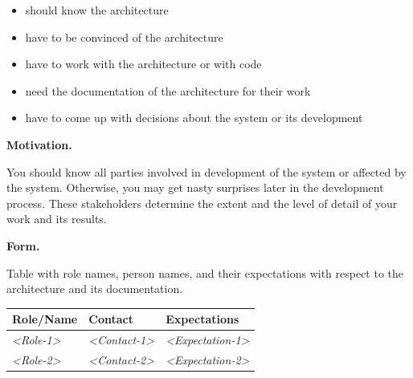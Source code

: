 \documentclass[]{article}
\begin{document}
\begin{itemize}
\item
  should know the architecture
\item
  have to be convinced of the architecture
\item
  have to work with the architecture or with code
\item
  need the documentation of the architecture for their work
\item
  have to come up with decisions about the system or its development
\end{itemize}

\textbf{Motivation.}

You should know all parties involved in development of the system or
affected by the system. Otherwise, you may get nasty surprises later in
the development process. These stakeholders determine the extent and the
level of detail of your work and its results.

\textbf{Form.}

Table with role names, person names, and their expectations with respect
to the architecture and its documentation.

\begin{longtable}[]{@{}lll@{}}
\toprule
\begin{minipage}[b]{0.18\columnwidth}\raggedright
Role/Name\strut
\end{minipage} & \begin{minipage}[b]{0.37\columnwidth}\raggedright
Contact\strut
\end{minipage} & \begin{minipage}[b]{0.37\columnwidth}\raggedright
Expectations\strut
\end{minipage}\tabularnewline
\midrule
\endhead
\begin{minipage}[t]{0.18\columnwidth}\raggedright
\emph{\textless{}Role-1\textgreater{}}\strut
\end{minipage} & \begin{minipage}[t]{0.37\columnwidth}\raggedright
\emph{\textless{}Contact-1\textgreater{}}\strut
\end{minipage} & \begin{minipage}[t]{0.37\columnwidth}\raggedright
\emph{\textless{}Expectation-1\textgreater{}}\strut
\end{minipage}\tabularnewline
\begin{minipage}[t]{0.18\columnwidth}\raggedright
\emph{\textless{}Role-2\textgreater{}}\strut
\end{minipage} & \begin{minipage}[t]{0.37\columnwidth}\raggedright
\emph{\textless{}Contact-2\textgreater{}}\strut
\end{minipage} & \begin{minipage}[t]{0.37\columnwidth}\raggedright
\emph{\textless{}Expectation-2\textgreater{}}\strut
\end{minipage}\tabularnewline
\bottomrule
\end{longtable}
\end{document}
